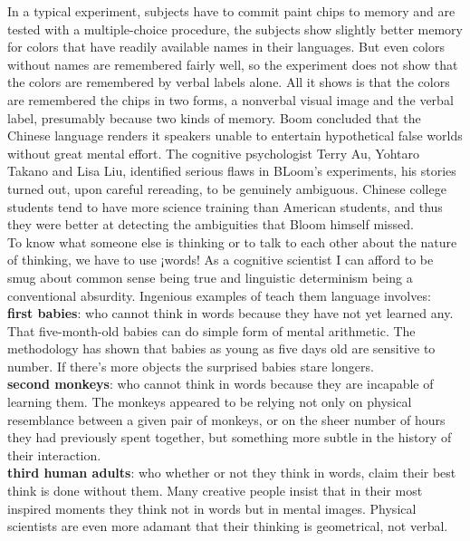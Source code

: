 \documentclass[13pt,letterpaper,onecolumn]{report}
\begin{document}
\hspace{1em}In a typical experiment, subjects have to commit paint chips to memory and are tested with a multiple-choice procedure, the subjects show slightly better memory for colors that have readily available names in their languages. But even colors without names are remembered fairly well, so the experiment does not show that the colors are remembered by verbal labels alone. All it shows is that the colors are remembered the chips in two forms, a nonverbal visual image and the verbal label, presumably because two kinds of memory. Boom concluded that the Chinese language renders it speakers unable to entertain hypothetical false worlds without great mental effort. The cognitive psychologist Terry Au, Yohtaro Takano and Lisa Liu, identified serious flaws in BLoom’s experiments, his stories turned out, upon careful rereading, to be genuinely ambiguous. Chinese college students tend to have more science training than American students, and thus they were better at detecting the ambiguities that Bloom himself missed.\\

\hspace{1em}To know what someone else is thinking or to talk to each other about the nature of thinking, we have to use ¡words! As a cognitive scientist I can afford to be smug about common sense being true and linguistic determinism being a conventional absurdity. Ingenious examples of teach them language involves: \\
\textbf{first babies}: who cannot think in words because they have not yet learned any. That five-month-old babies can do simple form of mental arithmetic. The methodology has shown that babies as young as five days old are sensitive to number. If there’s more objects the surprised babies stare longers.\\
\textbf{second monkeys}: who cannot think in words because they are incapable of learning them. The monkeys appeared to be relying not only on physical resemblance between a given pair of monkeys, or on the sheer number of hours they had previously spent together, but something more subtle in the history of their interaction. \\
\textbf{third human adults}: who whether or not they think in words, claim their best think is done without them. Many creative people insist that in their most inspired moments they think not in words but in mental images. Physical scientists are even more adamant that their thinking is geometrical, not verbal.\\
\end{document}
